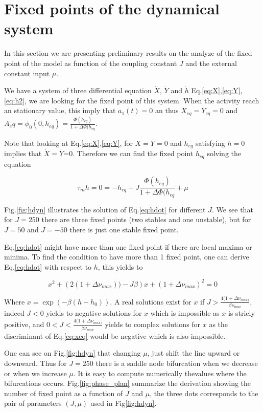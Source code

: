 \documentclass[12pt,twoside]{report}
\begin{document}
\section{Fixed points of the dynamical system} %

In this section we are presenting preliminary results on the analyze of the fixed point of the model as function of the coupling constant $J$ and the external constant input $\mu$. 

We have a system of three differential equation $\dot{X}$, $\dot{Y}$ and $\dot{h}$ Eq.\eqref{eq:X},\eqref{eq:Y},\eqref{eq:h2}, we are looking for the fixed point of this system. When the activity reach an stationary value, this imply that $a_1(t)=0$ an thus $X_{eq}=Y_{eq}=0$ and $A_eq=\phi_0(0,h_{eq})=\frac{\Phi(h_{eq})}{1+\Delta \Phi(h_{eq}}$. 

Note that looking at Eq.\eqref{eq:X},\eqref{eq:Y}, for $X=Y=0$ and $h_{eq}$ satisfying $\dot{h}=0$ implies that $\dot{X}=\dot{Y}$=0. Therefore we can find the fixed point $h_{eq}$ solving the equation

\begin{equation}
\label{eq:hdot}
\tau_m \dot{h}=0=-h_{eq}+J\frac{\Phi(h_{eq})}{1+\Delta \Phi(h_{eq}} +\mu
\end{equation}

Fig.\ref{fig:hdyn} illustrates the solution of Eq.\ref{eq:hdot} for different $J$. We see that for $J=250$ there are three fixed points (two stables and one unstable), but for $J=50$ and $J=-50$ there is just one stable fixed point. 

Eq.\eqref{eq:hdot} might have more than one fixed point if there are local maxima or minima. To find the condition to have more than 1 fixed point, one can derive Eq.\eqref{eq:hdot} with respect to $h$, this yields to

\begin{equation}
\label{eq:xeq}
x^2+\left(2(1+\Delta \nu_{max}))-J\beta\right)x +\left(1+\Delta\nu_{max}\right)^2=0
\end{equation}

Where $x=\exp(-\beta(h-h_0))$. A real solutions exist for $x$ if $J>\frac{4(1+\Delta \nu_{max)}}{\beta\nu_{max}}$, indeed $J<0$ yields to negative solutions for $x$ which is impossible as $x$ is stricly positive, and $0<J<\frac{4(1+\Delta \nu_{max)}}{\beta\nu_{max}}$ yields to complex solutions for $x$ as the discriminant of Eq.\eqref{eq:xeq} would be negative which is also impossible.

One can see on Fig.\ref{fig:hdyn} that changing $\mu$, just shift the line upward or downward. Thus for $J=250$ there is a saddle node bifurcation when we decrease or when we increase $\mu$. It is easy to compute numerically thevalues where the bifurcations occurs. Fig.\ref{fig:phase_plan} summarize the derivation showing the number of fixed point as a function of $J$ and $\mu$, the three dots corresponds to the pair of parameters $(J,\mu)$  used in Fig\ref{fig:hdyn}.
\end{document}
